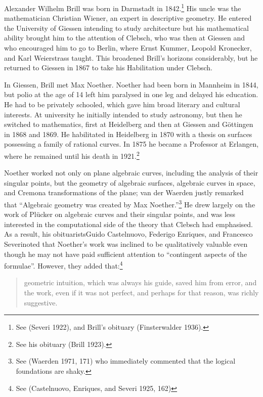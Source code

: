 Alexander Wilhelm Brill was born in Darmstadt in 1842.\footnote{See (Severi 1922),  and Brill's obituary (Finsterwalder 1936).} His  uncle was the mathematician Christian Wiener, an expert in descriptive geometry. He entered the University of Giessen intending to study architecture but his mathematical ability brought him to the attention of Clebsch, who was then at Giessen and who encouraged him to go  to Berlin, where  Ernst Kummer,  Leopold Kronecker, and Karl Weierstrass taught. This broadened Brill's horizons considerably, but he returned to Giessen in 1867 to take his Habilitation  under Clebsch.

In Giessen, Brill met Max Noether. Noether had been born in Mannheim in 1844, but polio at the age of 14 left him paralysed in one leg and delayed his education. He had to be privately schooled, which gave him  broad literary and cultural interests. At university he  initially intended to study astronomy, but then he switched to mathematics, first at Heidelberg and then at Giessen and G\"ottingen in 1868 and 1869. He habilitated in Heidelberg in 1870 with a thesis on surfaces possessing a family of rational curves. In 1875 he became a Professor at Erlangen, where he remained until his death in 1921.\footnote{See his obituary (Brill 1923).} 


Noether  worked not only on plane algebraic curves, including the analysis of their singular points, but the geometry of algebraic surfaces,  algebraic curves in space, and Cremona transformations of the plane;  van der Waerden justly remarked that ``Algebraic geometry was created by Max Noether.''\footnote{See (Waerden 1971, 171) who immediately commented that the logical foundations are shaky.} 
He drew largely on the work of Pl\"ucker on algebraic curves and their singular points, and was less interested in the computational side of the theory that Clebsch had emphasised. As a result, his obituarists\emdash Guido Castelnuovo, Federigo Enriques, and Francesco Severi\emdash noted that Noether's work was inclined to be qualitatively valuable even though he may not have paid sufficient attention to ``contingent aspects of the formulae''.  However, they added that:\footnote{See (Castelnuovo, Enriques, and Severi 1925, 162)}
\begin{quote}
geometric intuition, which was always his guide, saved him from error, and the work, even if it was not perfect, and perhaps for that reason, was richly suggestive.
\end{quote}



